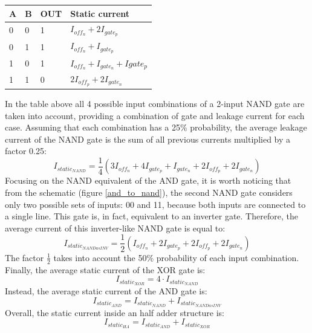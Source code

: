 \begin{center}
	\begin{tabular}{| l | l | l | l |}
		\hline
		A & B & OUT & Static current \\ \hline
		0 & 0 & 1 & $I_{off_n} + 2I_{gate_p}$ \\ 
		0 & 1 & 1 & $I_{off_n} + I_{gate_p}$\\
		1 & 0 & 1 & $I_{off_n} + I_{gate_n} + I{gate_p}$\\
		1 & 1 & 0 & $2I_{off_p} + 2I_{gate_n}$\\
		\hline
	\end{tabular}
\end{center}
In the table above all 4 possible input combinations of a 2-input NAND gate are taken into account, providing a combination of gate and leakage current for each case. Assuming that each combination has a 25\% probability, the average leakage current of the NAND gate is the sum of all previous currents multiplied by a factor 0.25:
\begin{equation}
I_{static_{NAND}} = \frac{1}{4}(3I_{off_n} + 4I_{gate_p} + I_{gate_n} + 2I_{off_p} + 2I_{gate_n})
\end{equation}
Focusing on the NAND equivalent of the AND gate, it is worth noticing that from the schematic (figure \ref{and_to_nand}), the second NAND gate considers only two possible sets of inputs: 00 and 11, because both inputs are connected to a single line. This gate is, in fact, equivalent to an inverter gate. Therefore, the average current of this inverter-like NAND gate is equal to:
\begin{equation}
I_{static_{NANDasINV}} = \frac{1}{2}(I_{off_n} + 2I_{gate_p} + 2I_{off_p} + 2I_{gate_n})
\end{equation}
The factor $\frac{1}{2}$ takes into account the 50\% probability of each input combination. Finally, the average static current of the XOR gate is:
\begin{equation}
I_{static_{XOR}} = 4\cdot I_{static_{NAND}}
\end{equation}
Instead, the average static current of the AND gate is:
\begin{equation}
I_{static_{AND}} = I_{static_{NAND}} + I_{static_{NANDasINV}}
\end{equation}
Overall, the static current inside an half adder structure is:
\begin{equation}
I_{static_{HA}} = I_{static_{AND}} + I_{static_{XOR}}
\end{equation}
